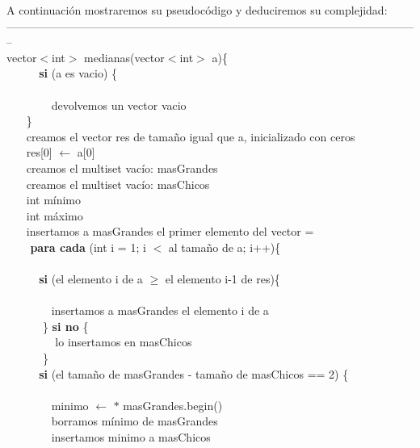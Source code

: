 A continuación mostraremos su pseudocódigo y deduciremos su complejidad: \\
--------------------------------------------------------------------------------------------------------------\\
vector$<$int$>$ medianas(vector$<$int$>$ a)\{ \\
$~~~~~~~~~~~~~$\textbf{si} (a es vacio) \{ \\ \\
$~~~~~~~~~~~~~~~~~~$devolvemos un vector vacio \\
$~~~~~~~~$\} \\
$~~~~~~~~$creamos el vector res de tamaño igual que a, inicializado con ceros \\
$~~~~~~~~$res[0] $\leftarrow$ a[0] \\
$~~~~~~~~$creamos el multiset vacío: masGrandes  \\
$~~~~~~~~$creamos el multiset vacío: masChicos  \\
$~~~~~~~~$int mínimo \\
$~~~~~~~~$int máximo \\
$~~~~~~~~$insertamos a masGrandes el primer elemento del vector  =  \\
$~~~~~~~~$ \textbf{para cada} (int i = 1; i $<$ al tamaño de a; i++)\{ \\  \\
$~~~~~~~~~~~~~$\textbf{si} (el elemento i de a $\geq$ el elemento i-1 de res)\{ \\  \\
$~~~~~~~~~~~~~~~~~~$insertamos a masGrandes el elemento i de a  \\
$~~~~~~~~~~~~~$ \} \textbf{si no} \{ \\
$~~~~~~~~~~~~~~~~~~$ lo insertamos en masChicos  \\
$~~~~~~~~~~~~~$ \} \\
$~~~~~~~~~~~~~$\textbf{si} (el tamaño de masGrandes - tamaño de masChicos == 2) \{ \\ \\
$~~~~~~~~~~~~~~~~~~$minimo $\leftarrow$ $\ast$ masGrandes.begin() \\
$~~~~~~~~~~~~~~~~~~$borramos mínimo de masGrandes   \\
$~~~~~~~~~~~~~~~~~~$insertamos minimo a masChicos  \\
